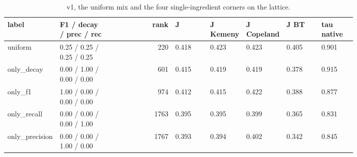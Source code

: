 \begin{table}[htbp]
\centering\tiny
\caption{v1, the uniform mix and the four single-ingredient corners on the lattice.}
\label{tab:grid_special_points}
\setlength{\tabcolsep}{3pt}
\begin{tabular}{p{0.158\linewidth}p{0.141\linewidth}rp{0.102\linewidth}p{0.102\linewidth}p{0.102\linewidth}p{0.102\linewidth}p{0.102\linewidth}}
\toprule
label & F1 / decay / prec / rec & rank & J & J Kemeny & J Copeland & J BT & tau native \\
\midrule
uniform & 0.25 / 0.25 / 0.25 / 0.25 & 220 & 0.418 & 0.423 & 0.423 & 0.405 & 0.901 \\
only\_\allowbreak{}decay & 0.00 / 1.00 / 0.00 / 0.00 & 601 & 0.415 & 0.419 & 0.419 & 0.378 & 0.915 \\
only\_\allowbreak{}f1 & 1.00 / 0.00 / 0.00 / 0.00 & 974 & 0.412 & 0.415 & 0.422 & 0.388 & 0.877 \\
only\_\allowbreak{}recall & 0.00 / 0.00 / 0.00 / 1.00 & 1763 & 0.395 & 0.395 & 0.399 & 0.365 & 0.831 \\
only\_\allowbreak{}precision & 0.00 / 0.00 / 1.00 / 0.00 & 1767 & 0.393 & 0.394 & 0.402 & 0.342 & 0.845 \\
\bottomrule
\end{tabular}
\end{table}
